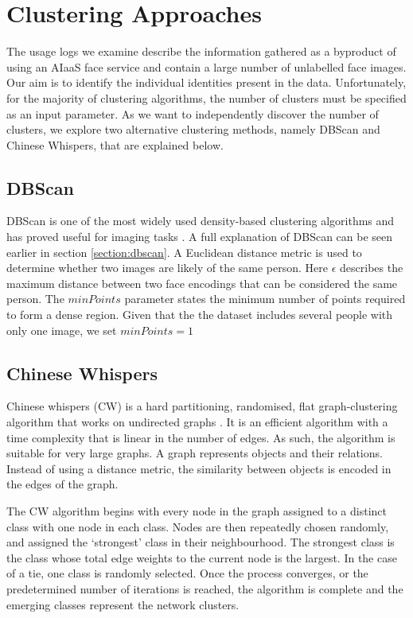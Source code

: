\documentclass[a4paper,12pt]{report}
\begin{document}
\section{Clustering Approaches}
\label{section:clustering_approaches}
The usage logs we examine describe the information gathered as a byproduct of using an AIaaS face service and contain a large number of unlabelled face images. Our aim is to identify the individual identities present in the data. Unfortunately, for the majority of clustering algorithms, the number of clusters must be specified as an input parameter. As we want to independently discover the number of clusters, we explore two alternative clustering methods, namely DBScan and Chinese Whispers, that are explained below. 

\subsection{DBScan}
DBScan is one of the most widely used density-based clustering algorithms and has proved useful for imaging tasks \cite{dhanachandra2017survey}. A full explanation of DBScan can be seen earlier in section \ref{section:dbscan}. A Euclidean distance metric is used to determine whether two images are likely of the same person. Here $\epsilon$ describes the maximum distance between two face encodings that can be considered the same person. The $minPoints$ parameter states the minimum number of points required to form a dense region. Given that the the dataset includes several people with only one image, we set $minPoints=1$ 

\subsection{Chinese Whispers}
Chinese whispers (CW) is a hard partitioning, randomised, flat graph-clustering algorithm that works on undirected graphs \cite{biemann2006chinese}. It is an efficient algorithm with a time complexity that is linear in the number of edges. As such, the algorithm is suitable for very large graphs. A graph represents objects and their relations. Instead of using a distance metric, the similarity between objects is encoded in the edges of the graph. 

The CW algorithm begins with every node in the graph assigned to a distinct class with one node in each class. Nodes are then repeatedly chosen randomly, and assigned the ‘strongest’ class in their neighbourhood. The strongest class is the class whose total edge weights to the current node is the largest. In the case of a tie, one class is randomly selected. Once the process converges, or the predetermined number of iterations is reached, the algorithm is complete and the emerging classes represent the network clusters. 
\end{document}
